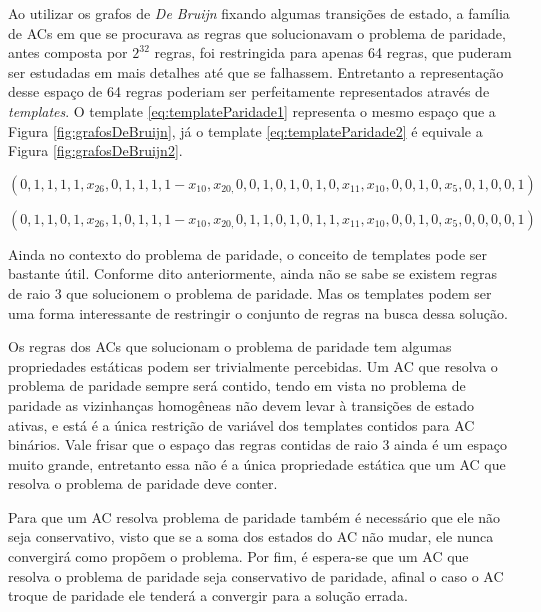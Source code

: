 \documentclass[12pt,a4paper]{article}
\begin{document}
	Ao utilizar os grafos de \textit{De Bruijn} fixando algumas transições de estado, a família de ACs em que se procurava as regras que solucionavam o problema de paridade, antes composta por $2^{32}$ regras, foi restringida para apenas 64 regras, que puderam ser estudadas em mais detalhes até que se falhassem. Entretanto a representação desse espaço de 64 regras poderiam ser perfeitamente representados através de \textit{templates}. O template \ref{eq:templateParidade1} representa o mesmo espaço que a Figura \ref{fig:grafosDeBruijn}, já o template \ref{eq:templateParidade2} é equivale a Figura \ref{fig:grafosDeBruijn2}.
	
	\begin{equation}
	\left(0,1,1,1,1,x_{26},0,1,1,1,1-x_{10},x_{20,}0,0,1,0,1,0,1,0,x_{11},x_{10},0,0,1,0,x_5,0,1,0,0,1\right)
	\label{eq:templateParidade1}
	\end{equation}
	
	\begin{equation}
	\left(0,1,1,0,1,x_{26},1,0,1,1,1-x_{10},x_{20,}0,1,1,0,1,0,1,1,x_{11},x_{10},0,0,1,0,x_5,0,0,0,0,1\right)
	\label{eq:templateParidade2}
	\end{equation}

	Ainda no contexto do problema de paridade, o conceito de templates pode ser bastante útil. Conforme dito anteriormente, ainda não se sabe se existem regras de raio 3 que solucionem o problema de paridade. Mas os templates podem ser uma forma interessante de restringir o conjunto de regras na busca dessa solução.

	Os regras dos ACs que solucionam o problema de paridade tem algumas propriedades estáticas podem ser trivialmente percebidas. Um AC que resolva o problema de paridade sempre será contido, tendo em vista no problema de paridade as vizinhanças homogêneas não devem levar à transições de estado ativas, e está é a única restrição de variável dos templates contidos para AC binários. Vale frisar que o espaço das regras contidas de raio 3 ainda é um espaço muito grande, entretanto essa não é a única propriedade estática que um AC que resolva o problema de paridade deve conter.

	Para que um AC resolva problema de paridade também é necessário que ele não seja conservativo, visto que se a soma dos estados do AC não mudar, ele nunca convergirá como propõem o problema. Por fim, é espera-se que um AC que resolva o problema de paridade seja conservativo de paridade, afinal o caso o AC troque de paridade ele tenderá a convergir para a solução errada.
\end{document}
